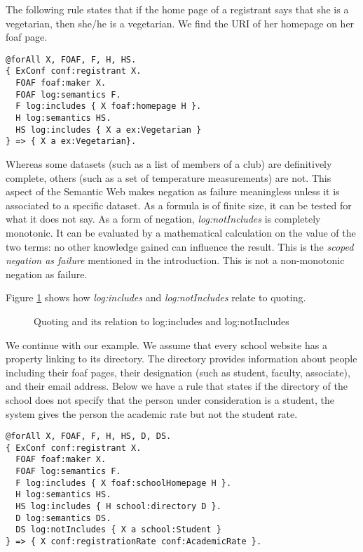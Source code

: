\documentclass{tlp}
\begin{document}
The following rule states that if the home page of a registrant says
that she is a vegetarian, then she/he is a vegetarian. We find the URI
of her homepage on her foaf page.

\begin{verbatim}
@forAll X, FOAF, F, H, HS.
{ ExConf conf:registrant X.
  FOAF foaf:maker X.
  FOAF log:semantics F.
  F log:includes { X foaf:homepage H }.
  H log:semantics HS.
  HS log:includes { X a ex:Vegetarian }
} => { X a ex:Vegetarian}.
\end{verbatim}

Whereas some datasets (such as a list of members of a club) are
definitively complete, others (such as a set of temperature
measurements) are not. This aspect of the Semantic Web makes negation
as failure meaningless unless it is associated to a specific dataset.
As a formula is of finite size, it can be tested for what it does not
say. As a form of negation, {\it log:notIncludes} is completely
monotonic.  It can be evaluated by a mathematical calculation on the
value of the two terms: no other knowledge gained can influence the
result.  This is the {\it scoped negation as failure} mentioned in the
introduction.  This is not a non-monotonic negation as failure.

Figure \ref{includes-not} shows how {\it log:includes} and {\it
  log:notIncludes} relate to quoting. 

\begin{figure}[tb]
  \centerline{}
  \caption{Quoting and its relation to log:includes and
    log:notIncludes}
  \label{includes-not}
\end{figure}

We continue with our example. We assume that every school website has
a property linking to its directory. The directory provides
information about people including their foaf pages, their designation
(such as student, faculty, associate), and their email address. Below
we have a rule that states if the directory of the school does not
specify that the person under consideration is a student, the system
gives the person the academic rate but not the student rate.

\begin{verbatim}
@forAll X, FOAF, F, H, HS, D, DS.
{ ExConf conf:registrant X.
  FOAF foaf:maker X.
  FOAF log:semantics F.
  F log:includes { X foaf:schoolHomepage H }.
  H log:semantics HS. 
  HS log:includes { H school:directory D }.
  D log:semantics DS.
  DS log:notIncludes { X a school:Student }
} => { X conf:registrationRate conf:AcademicRate }.
\end{verbatim}
\end{document}
